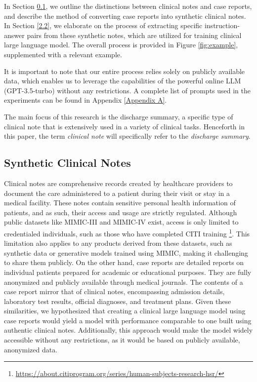 \documentclass[11pt]{article}
\begin{document}
In Section \ref{2.1}, we outline the distinctions between clinical notes and case reports, and describe the method of converting case reports into synthetic clinical notes. 
In Section \ref{2.2}, we elaborate on the process of extracting specific instruction-answer pairs from these synthetic notes, which are utilized for training clinical large language model.
The overall process is provided in Figure \ref{fig:example}, supplemented with a relevant example.

It is important to note that our entire process relies solely on publicly available data, which enables us to leverage the capabilities of the powerful online LLM (GPT-3.5-turbo) without any restrictions.
A complete list of prompts used in the experiments can be found in Appendix \ref{Appendix A}.

The main focus of this research is the discharge summary, a specific type of clinical note that is extensively used in a variety of clinical tasks.
Henceforth in this paper, the term \emph{clinical note} will specifically refer to the \emph{discharge summary}.

\subsection{Synthetic Clinical Notes} \label{2.1}

Clinical notes are comprehensive records created by healthcare providers to document the care administered to a patient during their visit or stay in a medical facility.
These notes contain sensitive personal health information of patients, and as such, their access and usage are strictly regulated. 
Although public datasets like MIMIC-III \citep{johnson2016mimic} and MIMIC-IV \citep{johnson2023mimic} exist, access is only limited to credentialed individuals, such as those who have completed CITI training \footnote{\url{https://about.citiprogram.org/series/human-subjects-research-hsr/}}. 
This limitation also applies to any products derived from these datasets, such as synthetic data or generative models trained using MIMIC, making it challenging to share them publicly.
On the other hand, case reports are detailed reports on individual patients prepared for academic or educational purposes. 
They are fully anonymized and publicly available through medical journals. 
The contents of a case report mirror that of clinical notes, encompassing admission details, laboratory test results, official diagnoses, and treatment plans. 
Given these similarities, we hypothesized that creating a clinical large language model using case reports would yield a model with performance comparable to one built using authentic clinical notes.
Additionally, this approach would make the model widely accessible without any restrictions, as it would be based on publicly available, anonymized data.
\end{document}
